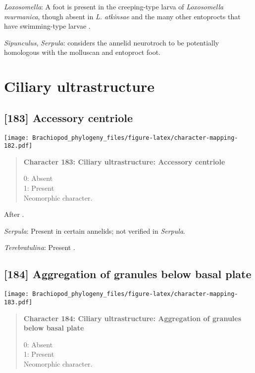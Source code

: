 \documentclass[openany]{book}
\theoremstyle{definition}
\theoremstyle{definition}
\theoremstyle{definition}
\theoremstyle{remark}
\begin{document}
\hypertarget{Loxosomella-coding-182}{}
\emph{Loxosomella}: A foot is present in the creeping-type larva of
\emph{Loxosomella} \emph{murmanica}, though absent in \emph{L. atkinsae}
and the many other entoprocts that have swimming-type larvae
\citep{Fuchs2008}.

\hypertarget{Serpula-coding-182}{}
\emph{Sipunculus}, \emph{Serpula}: \citet{Wingstrand1985} considers the
annelid neurotroch to be potentially homologous with the molluscan and
entoproct foot.

\section{Ciliary ultrastructure}\label{ciliary-ultrastructure}

\subsection*{{[}183{]} Accessory centriole}\label{accessory-centriole}

\texttt{[image: Brachiopod\_phylogeny\_files/figure-latex/character-mapping-182.pdf]}

\begin{quote}
\textbf{Character 183: Ciliary ultrastructure: Accessory centriole}

0: Absent\\
1: Present\\
Neomorphic character.
\end{quote}

After \citet{Lundin2009}.

\hypertarget{Serpula-coding-183}{}
\emph{Serpula}: Present in certain annelids; not verified in
\emph{Serpula}.

\hypertarget{Terebratulina-coding-183}{}
\emph{Terebratulina}: Present \citep{Luter1995}.

\subsection*{{[}184{]} Aggregation of granules below basal
plate}\label{aggregation-of-granules-below-basal-plate}

\texttt{[image: Brachiopod\_phylogeny\_files/figure-latex/character-mapping-183.pdf]}

\begin{quote}
\textbf{Character 184: Ciliary ultrastructure: Aggregation of granules
below basal plate}

0: Absent\\
1: Present\\
Neomorphic character.
\end{quote}
\end{document}
